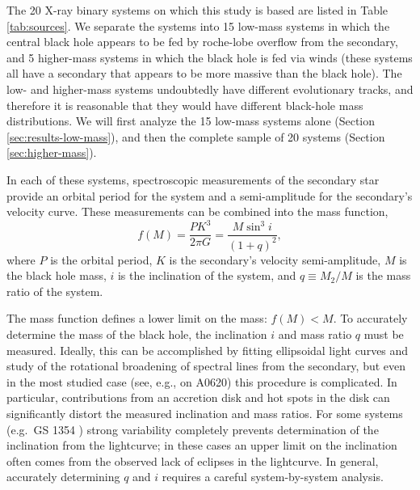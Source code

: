 \documentclass[preprint]{aastex}
\begin{document}
The 20 X-ray binary systems on which this study is based are listed in
Table \ref{tab:sources}.  We separate the systems into 15 low-mass
systems in which the central black hole appears to be fed by
roche-lobe overflow from the secondary, and 5 higher-mass systems in
which the black hole is fed via winds (these systems all have a
secondary that appears to be more massive than the black hole).  The
low- and higher-mass systems undoubtedly have different evolutionary
tracks, and therefore it is reasonable that they would have different
black-hole mass distributions.  We will first analyze the 15 low-mass
systems alone (Section \ref{sec:results-low-mass}), and then the
complete sample of 20 systems (Section \ref{sec:higher-mass}).

In each of these systems, spectroscopic measurements of the secondary
star provide an orbital period for the system and a semi-amplitude for
the secondary's velocity curve.  These measurements can be combined
into the mass function,
\begin{equation}
  \label{eq:mass-function}
  f(M) = \frac{P K^3}{2\pi G} = \frac{M \sin^3 i}{\left( 1 + q \right)^2},
\end{equation}
where $P$ is the orbital period, $K$ is the secondary's velocity
semi-amplitude, $M$ is the black hole mass, $i$ is the inclination of
the system, and $q \equiv M_2 / M$ is the mass ratio of the system.

The mass function defines a lower limit on the mass: $f(M) < M$.  To
accurately determine the mass of the black hole, the inclination $i$
and mass ratio $q$ must be measured.  Ideally, this can be
accomplished by fitting ellipsoidal light curves and study of the
rotational broadening of spectral lines from the secondary, but even
in the most studied case (see, e.g., \citet{Cantrell2010} on A0620)
this procedure is complicated.  In particular, contributions from an
accretion disk and hot spots in the disk can significantly distort the
measured inclination and mass ratios.  For some systems (e.g.\ GS 1354
\citep{Casares2009}) strong variability completely prevents
determination of the inclination from the lightcurve; in these cases
an upper limit on the inclination often comes from the observed lack
of eclipses in the lightcurve.  In general, accurately determining $q$
and $i$ requires a careful system-by-system analysis.
\end{document}
